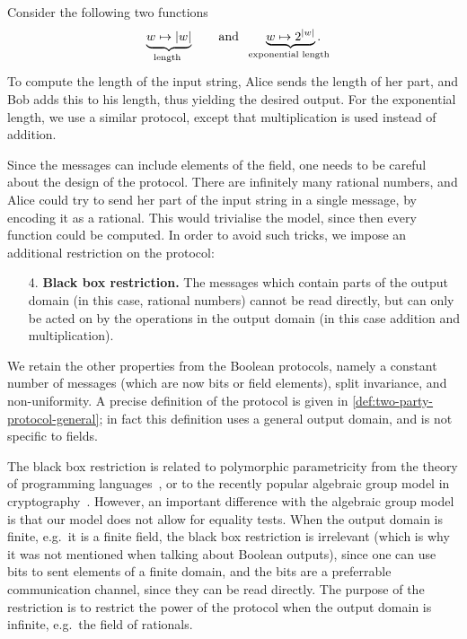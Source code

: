 \begin{myexample}\label{ex:length}
    Consider the following two functions
\begin{align*}
\myunderbrace{w \mapsto |w|}{length} \qquad \text{and} \qquad \myunderbrace{w \mapsto 2^{|w|}}{exponential length}.
\end{align*}
To compute the length of the input string, Alice  sends the length of her part, and Bob adds this to his length, thus yielding the desired output. For the exponential length, we use a similar protocol, except that multiplication is used instead of addition. 
\end{myexample}


Since the messages can include elements of the field, one needs to be careful about the design of the protocol. There are infinitely many rational numbers, and Alice could try to send her part of the input string in a single message, by encoding it as a rational. This would trivialise the model, since then every function could be computed. In order to avoid such tricks, we impose an additional restriction on the protocol:

\begin{enumerate}
    \item[4.] \textbf{Black box restriction.} The messages which contain parts of the output domain (in this case, rational numbers) cannot be read directly, but can only be acted on by the operations in the output domain (in this case addition and multiplication).
\end{enumerate}
We retain the other properties from the Boolean protocols, namely a constant number of messages (which are now bits or field elements), split invariance, and non-uniformity. A precise definition of the protocol is given in \cref{def:two-party-protocol-general}; in fact this definition uses a general output domain, and is not specific to fields.


The black box restriction is related to  polymorphic parametricity from the theory of programming languages~\cite[Section 7]{reynolds1983types}, or to the recently popular algebraic group model in cryptography~\cite[Section 1.2]{fuchsbauer2018algebraic}. However, an important difference with the algebraic group model is that our model does not allow for equality tests. When the output domain is finite, e.g.~it is a finite field, the black box restriction is irrelevant (which is why it was not mentioned when talking about Boolean outputs), since one can use bits to sent elements of a finite domain, and the bits are a preferrable communication channel, since they can be read directly. The purpose of the restriction is to restrict the power of the protocol when the output domain is infinite, e.g.~the field of rationals.


